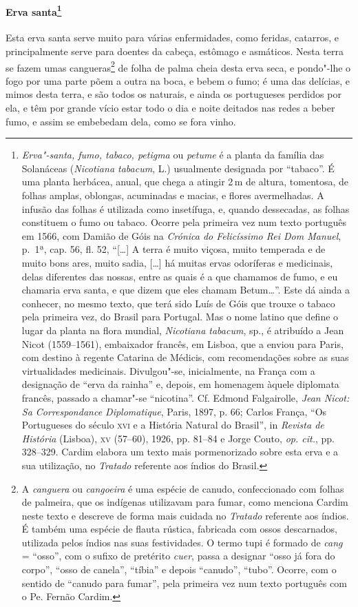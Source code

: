 \paragraph{Erva santa\footnote{ \textit{Erva"-santa, fumo, tabaco,
petigma} ou \textit{petume} é a planta da família das Solanáceas
(\textit{Nicotiana tabacum}, L.) usualmente designada por ``tabaco''. É
uma planta herbácea, anual, que chega a atingir 2\,m de altura,
tomentosa, de folhas amplas, oblongas, acuminadas e macias, e flores
avermelhadas. A infusão das folhas é utilizada como insetífuga, e,
quando dessecadas, as folhas constituem o fumo ou tabaco. Ocorre pela
primeira vez num texto português em 1566, com Damião de Góis na
\textit{Crónica do Felicíssimo Rei Dom Manuel}, p.~1ª, cap. 56, fl. 52,
``[\ldots{}] A terra é muito viçosa, muito temperada e de muito bons ares,
muito sadia, [\ldots{}] há muitas ervas odoríferas e medicinais, delas
diferentes das nossas, entre as quais é a que chamamos de fumo, e eu
chamaria erva santa, e que dizem que eles chamam Betum\ldots{}''. Este dá
ainda a conhecer, no mesmo texto, que terá sido Luís de Góis que
trouxe o tabaco pela primeira vez, do Brasil para Portugal. Mas o
nome latino que define o lugar da planta na flora mundial,
\textit{Nicotiana tabacum}, sp., é atribuído a Jean Nicot (1559--1561), 
embaixador francês, em Lisboa, que a enviou para Paris, com destino à
regente Catarina de Médicis, com recomendações sobre as suas
virtualidades medicinais. Divulgou"-se, inicialmente, na França com a
designação de ``erva da rainha'' e, depois, em homenagem àquele diplomata
francês, passado a chamar"-se ``nicotina''. Cf. Edmond Falgairolle,
\textit{Jean Nicot: Sa Correspondance Diplomatique}, Paris, 1897, p.
66; Carlos França, ``Os Portugueses do século \textsc{xvi} e a História Natural
do Brasil'', in \textit{Revista de História} (Lisboa), \textsc{xv} (57--60),
1926, pp. 81--84 e Jorge Couto, \textit{op. cit.}, pp. 328--329. Cardim
elabora um texto mais pormenorizado sobre esta erva e a sua utilização,
no \textit{Tratado} referente aos índios do Brasil.}} Esta
erva santa serve muito para várias enfermidades, como feridas,
catarros, e principalmente serve para doentes da cabeça, estômago e
asmáticos. Nesta terra se fazem umas cangueras\footnote{ A
\textit{canguera} ou \textit{cangoeira} é uma espécie de canudo,
confeccionado com folhas de palmeira, que os indígenas utilizavam para
fumar, como menciona Cardim neste texto e descreve de forma mais
cuidada no \textit{Tratado} referente aos índios. É também uma espécie
de flauta rústica, fabricada com ossos descarnados, utilizada pelos
índios nas suas festividades. O termo tupi é formado de \textit{cang} =
``osso'', com o sufixo de pretérito \textit{cuer}, passa a designar ``osso
já fora do corpo'', ``osso de canela'', ``tíbia'' e depois ``canudo'', ``tubo''.
Ocorre, com o sentido de ``canudo para fumar'', pela primeira vez num
texto português com o Pe. Fernão Cardim.} de folha de palma cheia desta
erva seca, e pondo"-lhe o fogo por uma parte põem a outra na boca, e
bebem o fumo; é uma das delícias, e mimos desta terra, e são todos os
naturais, e ainda os portugueses perdidos por ela, e têm por grande
vício estar todo o dia e noite deitados nas redes a beber fumo, e assim
se embebedam dela, como se fora vinho. 

